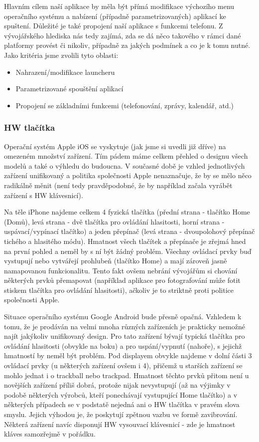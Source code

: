 \documentclass[thesis=M,czech]{FITthesis}[2012/06/26]
\begin{document}
Hlavním cílem naší aplikace by měla být přímá modifikace výchozího menu operačního systému a nabízení (případně parametrizovaných) aplikací ke spuštení. Důležité je také propojení naší aplikace s funkcemi telefonu. Z vývojářského hlediska nás tedy zajímá, zda se dá něco takového v rámci dané platformy provést či nikoliv, případně za jakých podmínek a co je k tomu nutné. Jako kritéria jsme zvolili tyto oblasti:

\begin{itemize}
\item    Nahrazení/modifikace launcheru
\item    Parametrizované spouštění aplikací
\item    Propojení se základními funkcemi (telefonování, zprávy, kalendář, atd.)
\end{itemize}

\subsubsection*{HW tlačítka}
Operační systém Apple iOS se vyskytuje (jak jsme si uvedli již dříve) na omezeném množství zařízení. Tím pádem máme celkem přehled o designu všech modelů a také o výhledu do budoucna. V současné době je vzhled jednotlivých zařízení unifikovaný a politika společnosti Apple nenaznačuje, že by se mělo něco radikálně měnit (není tedy pravděpodobné, že by například začala vyrábět zařízení s HW klávesnicí).

Na těle iPhone najdeme celkem 4 fyzická tlačítka (přední strana - tlačítko Home (Domů), levá strana - dvě tlačítka pro ovládání hlasitosti, horní strana - uspávací/vypínací tlačítko) a jeden přepínač (levá strana - dvoupolohový přepínač tichého a hlasitého módu)\cite{iphone}. Hmatnost všech tlačítek a přepínače je zřejmá hned na první pohled a neměl by s ní být žádný problém. Všechny ovládací prvky buď vystupují nebo vytvářejí prohlubeň (tlačítko Home) a mají zároveň jasně namapovanou funkcionalitu\cite{iphone_anatomy}. Tento fakt ovšem nebrání vývojářům si chování některých prvků přemapovat (například aplikace pro fotografování může fotit stiskem tlačítka pro ovládání hlasitosti), ačkoliv je to striktně proti politice společnosti Apple.

Situace operačního systému Google Android bude přesně opačná. Vzhledem k tomu, že je prodáván na velmi mnoha různých zařízeních je prakticky nemožné najít jakýkoliv unifikovaný design. Pro tato zařízení bývají typická tlačítka pro ovládání hlasitosti (obvykle na boku) a pro uspání/vypnutí (nahoře), s jejichž hmatností by neměl být problém. Pod displayem obvykle najdeme v dolní části 3 ovládací prvky (u některých zařízení ovšem i 4), přičemž u starších zařízení se mohlo jednat i o trackball nebo trackpad. Hmatnost těchto prvků přitom není u novějších zařízení příliš dobrá, protože nijak nevystupují (až na výjimky v podobě některých výrobců, kteří ponechávají vystupující Home tlačítko) a v některých případech se v podstatě nejedná ani o HW tlačítka v pravém slova smyslu. Jejich výhodou je, že poskytují zpětnou vazbu ve formě zavibrování. Některá zařízení navíc disponují HW vysouvací klávesnicí - zde je hmatnost kláves samozřejmě v pořádku.
\end{document}
